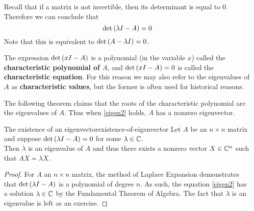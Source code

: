 Recall that if a matrix
is not invertible, then its determinant is equal to $0$.  Therefore we
can conclude that
\begin{equation}
\det \left(\lambda I - A\right) =0  \label{eigen2}
\end{equation}
Note that this is equivalent to $\det \left(A- \lambda I \right) =0$. 

The expression $\det \left(x I-A\right) $ is a polynomial (in
the variable $x$) called the
\textbf{characteristic polynomial of $A$}, and 
$\det \left(x I-A\right) =0$ is called the \textbf{characteristic
equation}. For this reason we may also refer to
the eigenvalues of $A$ as \textbf{characteristic values}, but the
former is often used for historical reasons.

The following theorem claims that the roots of the characteristic
polynomial are the eigenvalues of $A$.  Thus when \ref{eigen2}
holds, $A$ has a nonzero eigenvector.

\begin{theorem}{The existence of an eigenvector}{existence-of-eigenvector}
Let $A$ be an $n\times n$ matrix and suppose $\det \left(\lambda I -
A\right) =0$ for some $ \lambda \in \mathbb{C}$.  \\
Then $\lambda$ is an eigenvalue of $A$ and thus there exists a nonzero
vector $X \in \mathbb{C}^{n}$ such that $AX=\lambda X$. 
\end{theorem}

\begin{proof}
For $A$ an $n\times n$ matrix, the method of Laplace
Expansion demonstrates that $\det \left(\lambda I - A \right) $ is a
polynomial of degree $n.$ As such, the equation
\ref{eigen2} has a solution $\lambda \in \mathbb{C}$ by the Fundamental
Theorem of Algebra. The fact that $\lambda$ is an eigenvalue is left as an exercise. 
\end{proof}
